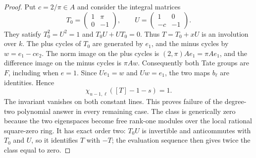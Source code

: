 \begin{proof}
Put $c=2/\pi\in A$ and consider the integral matrices
\[
 T_0=\begin{pmatrix}1&\pi\\0&-1\end{pmatrix},\qquad
 U=\begin{pmatrix}1&0\\-c&-1\end{pmatrix}.
\]
They satisfy $T_0^2=U^2=1$ and $T_0U+UT_0=0$.
Thus $T=T_0+xU$ is an involution over $k$.
The plus cycles of $T_0$ are generated by $e_1$, and the
minus cycles by $w=e_1-ce_2$. The norm image on the plus
cycles is $(2,\pi)Ae_1=\pi Ae_1$, and the difference image
on the minus cycles is $\pi Aw$. Consequently both Tate
groups are $F$, including when $e=1$.
Since $Ue_1=w$ and $Uw=e_1$, the two maps $b_\ell$ are
identities. Hence
\[
 \chi_{u-1,\ell}([T]-1-s)=1.
\]
The invariant vanishes on both constant lines. This proves failure
of the degree-two polynomial answer in every remaining case.
The class is generically zero because the two eigenspaces become
free rank-one modules over the local rational square-zero ring.
It has exact order two: $T_0U$ is invertible and anticommutes
with $T_0$ and $U$, so it identifies $T$ with $-T$; the
evaluation sequence then gives twice the class equal to zero.
\end{proof}
